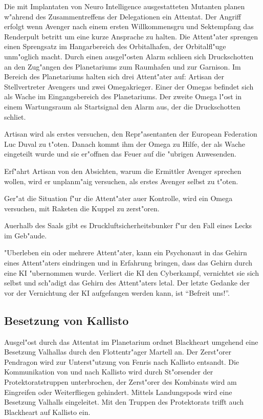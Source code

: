 Die mit Implantaten von Neuro Intelligence ausgestatteten Mutanten planen w"ahrend des Zusammentreffens der Delegationen ein Attentat. Der Angriff erfolgt wenn Avenger nach einem ersten Willkommensgru\3 und Sektempfang das Renderpult betritt um eine kurze Ansprache zu halten. Die Attent"ater sprengen einen Sprengsatz im Hangarbereich des Orbitalhafen, der Orbitalfl"uge unm"oglich macht. Durch einen ausgel"osten Alarm schlie\3en sich Druckschotten an den Zug"angen des Planetariums zum Raumhafen und zur Garnison. Im Bereich des Planetariums halten sich drei Attent"ater auf: Artisan der Stellvertreter Avengers und zwei Omegakrieger. Einer der Omegas befindet sich als Wache im Eingangsbereich des Planetariums. Der zweite Omega l"ost in einem Wartungsraum als Startsignal den Alarm aus, der die Druckschotten schlie\3t.

\begin{remarks}
Artisan wird als erstes versuchen, den Repr"asentanten der European Federation Luc Duval zu t"oten. Danach kommt ihm der Omega zu Hilfe, der als Wache eingeteilt wurde und sie er"offnen das Feuer auf die "ubrigen Anwesenden.

Erf"ahrt Artisan von den Absichten, warum die Ermittler Avenger sprechen wollen, wird er unplanm"a\3ig versuchen, als erstes Avenger selbst zu t"oten.

Ger"at die Situation f"ur die Attent"ater au\3er Kontrolle, wird ein Omega versuchen, mit Raketen die Kuppel zu zerst"oren.

Au\3erhalb des Saals gibt es Druckluftsicherheitsbunker f"ur den Fall eines Lecks im Geb"aude.

"Uberleben ein oder mehrere Attent"ater, kann ein Psychonaut in das Gehirn eines Attent"aters eindringen und in Erfahrung bringen, dass das Gehirn durch eine KI "ubernommen wurde. Verliert die KI den Cyberkampf, vernichtet sie sich selbst und sch"adigt das Gehirn des Attent"aters letal. Der letzte Gedanke der vor der Vernichtung der KI aufgefangen werden kann, ist "`Befreit uns!"'.
\end{remarks}

\subsection{Besetzung von Kallisto}

Ausgel"ost durch das Attentat im Planetarium ordnet Blackheart umgehend eine Besetzung Valhallas durch den Flottentr"ager Martell an. Der Zerst"orer Pendragon wird zur Unterst"utzung von Fenris nach Kallisto entsandt. Die Kommunikation von und nach Kallisto wird durch St"orsender der Protektoratstruppen unterbrochen, der Zerst"orer des Kombinats wird am Eingreifen oder Weiterfliegen gehindert. Mittels Landungspods wird eine Besetzung Valhalls eingeleitet. Mit den Truppen des Protektorats trifft auch Blackheart auf Kallisto ein.

